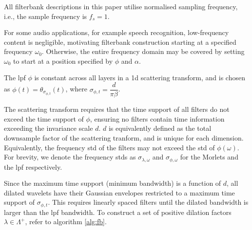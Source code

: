 \documentclass[journal]{IEEEtran}
\begin{document}

All filterbank descriptions in this paper utilise normalised sampling frequency, i.e., the sample frequency is $f_s = 1$.

For some audio applications, for example speech recognition, low-frequency content is negligible, motivating filterbank construction starting at a specified frequency $\omega_0$. Otherwise, the entire frequency domain may be covered by setting $\omega_0$ to start at a position specified by $\phi$ and $\alpha$.

The \ac{lpf} $\phi$ is constant across all layers in a \ac{1d} scattering transform, and is chosen as $\phi(t) = \theta_{\sigma_{\phi, t}}(t)$, where $\sigma_{\phi, t} = \dfrac{d}{ \pi \beta}$.

The scattering transform requires that the time support of all filters do not exceed the time support of $\phi$, ensuring no filters contain time information exceeding the invariance scale $d$. $d$ is equivalently defined as the total downsample factor of the scattering tranform, and is unique for each dimension. Equivalently, the frequency \ac{std} of the filters may not exceed the \ac{std} of $\phi(\omega)$. For brevity, we denote the frequency \ac{std}s as $\sigma_{\lambda, \omega}$ and $\sigma_{\phi, \omega}$ for the Morlets and the \ac{lpf} respectively. 

 Since the maximum time support (minimum bandwidth) is a function of $d$, all dilated wavelets have their Gaussian envelopes restricted to a maximum time support of $\sigma_{\phi, t}$. This requires linearly spaced filters until the dilated bandwidth is larger than the \ac{lpf} bandwidth. To construct a set of positive dilation factors $\lambda \in \Lambda^+$, refer to algorithm \ref{alg:fb}.
\end{document}
